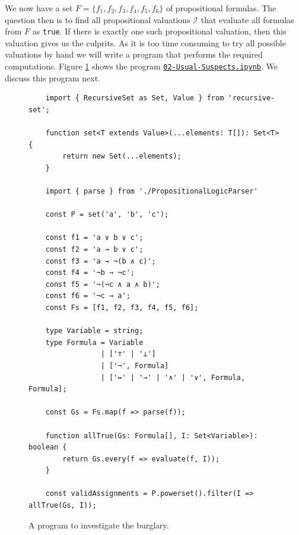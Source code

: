 We now have a set $F = \{ f_1, f_2, f_3, f_4, f_5, f_6 \}$ of propositional formulas.
The question then is to find all propositional valuations $\mathcal{I}$ that evaluate all formulas from $F$ as
\texttt{true}.  If there is exactly one such propositional valuation, then this valuation gives us the culprits.
As it is too time consuming to try all possible valuations by hand we will write a program that performs the
required computations.
Figure \ref{fig:Usual-Suspects.ipynb} shows the program
\href{https://github.com/karlstroetmann/Logic/blob/master/TypeScript/Chapter-4/02-Usual-Suspects.ipynb}{\texttt{02-Usual-Suspects.ipynb}}.
We discuss this program next.

\begin{figure}[!ht]
  \centering
\begin{verbatim}
    import { RecursiveSet as Set, Value } from 'recursive-set';
    
    function set<T extends Value>(...elements: T[]): Set<T> {
        return new Set(...elements);
    }
    
    import { parse } from './PropositionalLogicParser'
    
    const P = set('a', 'b', 'c');
    
    const f1 = 'a ∨ b ∨ c';
    const f2 = 'a → b ∨ c';
    const f3 = 'a → ¬(b ∧ c)';
    const f4 = '¬b → ¬c';
    const f5 = '¬(¬c ∧ a ∧ b)';
    const f6 = '¬c → a';
    const Fs = [f1, f2, f3, f4, f5, f6];
    
    type Variable = string;
    type Formula = Variable 
                 | ['⊤' | '⊥'] 
                 | ['¬', Formula] 
                 | ['↔' | '→' | '∧' | '∨', Formula, Formula];
    
    const Gs = Fs.map(f => parse(f));
        
    function allTrue(Gs: Formula[], I: Set<Variable>): boolean {
        return Gs.every(f => evaluate(f, I));
    }
    
    const validAssignments = P.powerset().filter(I => allTrue(Gs, I));
\end{verbatim}
\vspace*{-0.3cm}
  \caption{A program to investigate the burglary.}
  \label{fig:Usual-Suspects.ipynb}
\end{figure}

